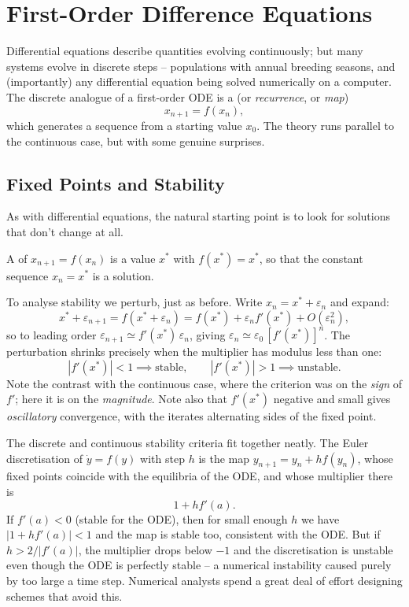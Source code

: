 \section{First-Order Difference Equations}

Differential equations describe quantities evolving continuously; but many systems evolve in discrete steps -- populations with annual breeding seasons, and (importantly) any differential equation being solved numerically on a computer. The discrete analogue of a first-order ODE is a  (or \emph{recurrence}, or \emph{map})
$$
x_{n + 1} = f(x_n),
$$
which generates a sequence from a starting value $x_0$. The theory runs parallel to the continuous case, but with some genuine surprises.

\subsection{Fixed Points and Stability}

As with differential equations, the natural starting point is to look for solutions that don't change at all.

\begin{definition}
	A  of $x_{n+1} = f(x_n)$ is a value $x^*$ with $f(x^*) = x^*$, so that the constant sequence $x_n = x^*$ is a solution.
\end{definition}

To analyse stability we perturb, just as before. Write $x_n = x^* + \varepsilon_n$ and expand:
$$
x^* + \varepsilon_{n + 1} = f(x^* + \varepsilon_n) = f(x^*) + \varepsilon_n f'(x^*) + O(\varepsilon_n^2),
$$
so to leading order $\varepsilon_{n+1} \simeq f'(x^*)\, \varepsilon_n$, giving $\varepsilon_n \simeq \varepsilon_0 \, [f'(x^*)]^n$. The perturbation shrinks precisely when the multiplier has modulus less than one:
$$
|f'(x^*)| < 1 \implies \text{stable}, \qquad |f'(x^*)| > 1 \implies \text{unstable}.
$$
Note the contrast with the continuous case, where the criterion was on the \emph{sign} of $f'$; here it is on the \emph{magnitude}. Note also that $f'(x^*)$ negative and small gives \emph{oscillatory} convergence, with the iterates alternating sides of the fixed point.

\begin{remark}
	The discrete and continuous stability criteria fit together neatly. The Euler discretisation of $\dot y = f(y)$ with step $h$ is the map $y_{n + 1} = y_n + h f(y_n)$, whose fixed points coincide with the equilibria of the ODE, and whose multiplier there is
	$$
	1 + h f'(a).
	$$
	If $f'(a) < 0$ (stable for the ODE), then for small enough $h$ we have $|1 + hf'(a)| < 1$ and the map is stable too, consistent with the ODE. But if $h > 2/|f'(a)|$, the multiplier drops below $-1$ and the discretisation is unstable even though the ODE is perfectly stable -- a numerical instability caused purely by too large a time step. Numerical analysts spend a great deal of effort designing schemes that avoid this.
\end{remark}


